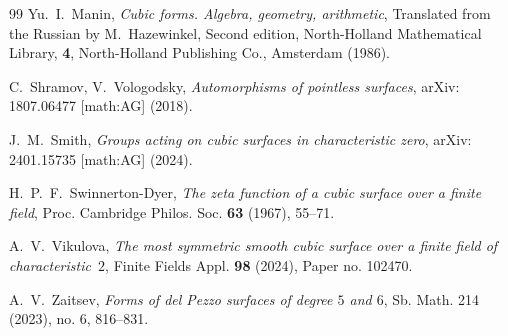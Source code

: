 \documentclass{amsart}
\numberwithin{equation}{section}
\theoremstyle{plain}
\theoremstyle{definition}
\theoremstyle{remark}
\begin{document}
\begin{thebibliography}{99}
Yu.~I.~Manin,  \emph{Cubic forms. Algebra, geometry, arithmetic}, Translated from the Russian by M.~Hazewinkel, Second edition, North-Holland Mathematical Library, \textbf{4}, North-Holland Publishing Co., Amsterdam (1986).


C.~Shramov, V.~Vologodsky, \emph{Automorphisms of pointless surfaces}, arXiv: 1807.06477 [math:AG] (2018).

J.~M.~Smith, \emph{Groups acting on cubic surfaces in characteristic zero}, arXiv: 2401.15735 [math:AG] (2024).


 H.~P.~F.~Swinnerton-Dyer, \emph{The zeta function of a cubic surface over a finite field}, Proc. Cambridge Philos. Soc. \textbf{63} (1967), 55--71.


A.~V.~Vikulova, \emph{The most symmetric smooth cubic surface over a finite field of characteristic~$2$}, Finite Fields Appl. \textbf{98} (2024), Paper no. 102470.


A.~V.~Zaitsev,  \emph{Forms of del Pezzo surfaces of degree $5$ and $6$},  Sb. Math. 214 (2023), no. 6, 816--831.


\end{thebibliography}
\end{document}
